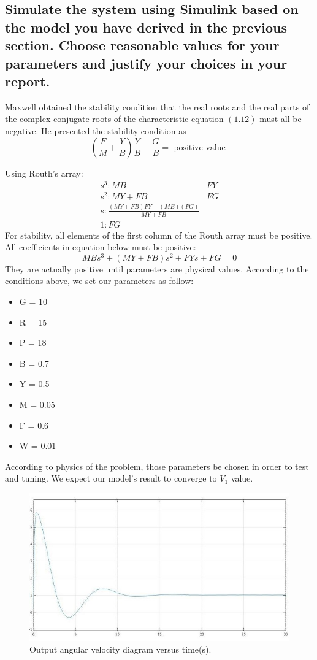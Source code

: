 \documentclass[11pt]{scrartcl} %
\begin{document}
\subsection{Simulate the system using Simulink based on the model you have derived in the previous section. Choose reasonable values for your parameters and justify your choices in your report.}
Maxwell obtained the stability condition that the real roots and the real parts of the complex conjugate roots of the characteristic equation $(1.12)$ must all be negative. He presented the stability condition as
\begin{equation}
\left(\frac{F}{M}+\frac{Y}{B}\right) \frac{Y}{B}-\frac{G}{B}=\text { positive value }
\end{equation}

Using Routh's array:
\[
\begin{array}{lc}
s^{3}: M B & F Y \\
s^{2}: M Y+F B & F G \\
s: \frac{(M Y+F B) F Y-(M B)(F G)}{M Y+F B} & \\
1: F G &
\end{array}
\]
For stability, all elements of the first column of the Routh array must be positive.
All coefficients in equation below must be positive:
\begin{equation}
M B s^{3}+(M Y+F B) s^{2}+F Y s+F G=0
\end{equation}
They are actually positive until parameters are physical values.
According to the conditions above, we set our parameters as follow:
\begin{itemize}
  \item G = 10
  \item R = 15
  \item P = 18
  \item B = 0.7
  \item Y = 0.5
  \item M = 0.05
  \item F = 0.6
  \item W = 0.01
\end{itemize}
According to physics of the problem, those parameters be chosen in order to test and tuning. We expect our model's result to converge to $V_1$ value.
\begin{figure}[h] 
	\centering
	\includegraphics[width=0.7\columnwidth]{images/p10.jpg}
	\caption{Output angular velocity diagram versus time(s).}
\end{figure}
\end{document}
